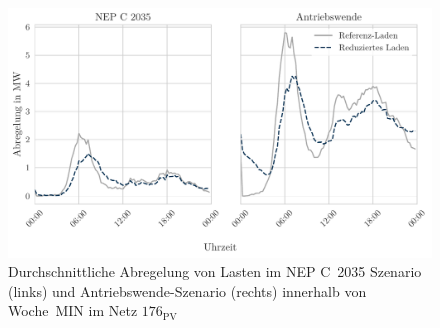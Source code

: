 \begin{figure}[H]
    \centering
    \includegraphics[width=\textwidth]{Bilder/176_load_curtailment_per_strategy}
    \caption[Durchschnittliche Abregelung von Lasten im NEP C~\num{2035} Szenario und Antriebswende-Szenario innerhalb von Woche~MIN im Netz \num{176}]{Durchschnittliche Abregelung von Lasten im NEP C~\num{2035} Szenario (links) und Antriebswende-Szenario (rechts) innerhalb von Woche~MIN im Netz \(176_{\text{PV}}\)}\label{fig:176_load_curtailment_per_strategy}
\end{figure}